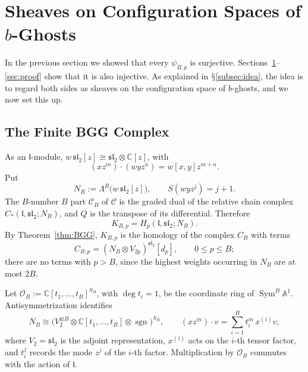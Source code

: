 \documentclass[11pt]{amsart}
\numberwithin{equation}{section}
\renewcommand{\S}{\mbox{$\mathsection$}}
\theoremstyle{definition}
\theoremstyle{remark}
\newcommand{\C}{\mathbb{C}}
\newcommand{\A}{\mathbb{A}}
\newcommand{\sltwo}{\mathfrak{sl}_2}
\newcommand{\lie}{\mathfrak{l}}
\newcommand{\cC}{\mathcal{C}}
\newcommand{\cO}{\mathcal{O}}
\newcommand{\Sym}{\operatorname{Sym}}
\newcommand{\sgn}{\operatorname{sgn}}
\begin{document}
\section{Sheaves on Configuration Spaces of $b$-Ghosts}\label{sec:sheaves}

In the previous section we showed that every $\psi_{B,p}$ is surjective. Sections~\ref{sec:sheaves}--\ref{sec:proof} show that it is also injective. As explained in \S\ref{subsec:idea}, the idea is to regard both sides as sheaves on the configuration space of $b$-ghosts, and we now set this up.

\subsection{The Finite BGG Complex}\label{subsec:BGG}
As an $\lie$-module, $w\,\sltwo[z]\cong\sltwo\otimes\C[z]$, with
\begin{equation}\label{eq:a-action}
(xz^m)\cdot(wyz^n)=w[x,y]z^{m+n}.
\end{equation}
Put
\begin{equation}\label{eq:NB}
N_B:=\Lambda^B\bigl(w\,\sltwo[z]\bigr),\qquad S(wyz^j)=j+1 .
\end{equation}
The $B$-number $B$ part $\cC_B$ of $\cC$ is the graded dual of the relative chain complex $C_*(\lie,\sltwo;N_B)$, and $Q$ is the transpose of its differential. Therefore
\begin{equation}\label{eq:K}
K_{B,p}=H_p(\lie,\sltwo;N_B).
\end{equation}
By Theorem~\ref{thm:BGG}, $K_{B,p}$ is the homology of the complex $C_B$ with terms
\begin{equation}\label{eq:finiteBGG}
C_{B,p}=(N_B\otimes V_{2p})^{\sltwo}[d_p],\qquad 0\le p\le B;
\end{equation}
there are no terms with $p>B$, since the highest weights occurring in $N_B$ are at most $2B$.

Let $\cO_B:=\C[t_1,\dots,t_B]^{S_B}$, with $\deg t_i=1$, be the coordinate ring of $\Sym^B\A^1$. Antisymmetrization identifies
\begin{equation}\label{eq:rootmodule}
N_B\cong\bigl(V_2^{\otimes B}\otimes\C[t_1,\dots,t_B]\otimes\sgn\bigr)^{S_B},\qquad
(xz^m)\cdot v=\sum_{i=1}^Bt_i^m\,x^{(i)}v,
\end{equation}
where $V_2=\sltwo$ is the adjoint representation, $x^{(i)}$ acts on the $i$-th tensor factor, and $t_i^j$ records the mode $z^j$ of the $i$-th factor. Multiplication by $\cO_B$ commutes with the action of $\lie$.
\end{document}
